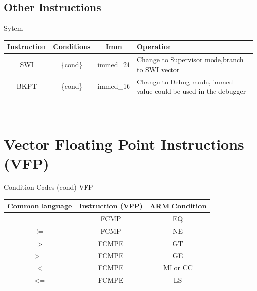 {\begin{landscape}
\section{Other Instructions}
{\rot Sytem}\\
\begin{tabular}{|c|c|c|l|}
\hline
Instruction & Conditions & Imm & Operation\\
\hline
SWI & \{cond\} & immed\_24 & Change to Supervisor mode,branch to SWI vector\\ 
\hline
BKPT & \{cond\} & immed\_16 & Change to Debug mode, immed-value could be used in the debugger\\ 
\hline
\end{tabular}
\\

\end{landscape}
}

\newpage
\section{Vector Floating Point Instructions (VFP)}

\begin{center}
Condition Codes (cond) VFP \\
\begin{tabular}{|c|c|c|}
\hline
Common language & Instruction (VFP) & ARM Condition\\
\hline
== & FCMP & EQ\\
\hline
!= & FCMP & NE\\
\hline
\textgreater & FCMPE & GT\\
\hline
\textgreater= & FCMPE & GE\\
\hline
\textless & FCMPE & MI or CC\\
\hline
\textless= & FCMPE & LS\\
\hline
\end{tabular}
\end{center}


